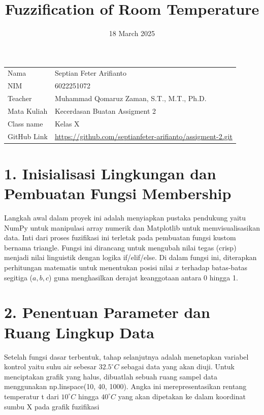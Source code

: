 \documentclass{article}
\title{Fuzzification of Room Temperature 
}
\date{18 March 2025}
\begin{document}
\maketitle


\noindent\begin{tabular}{l @{ : } l}
        Nama                &  Septian Feter Arifianto \\  
        NIM                 &  6022251072 \\  
        Teacher             &  Muhammad Qomaruz Zaman, S.T., M.T., Ph.D.\\
        Mata Kuliah         &  Kecerdasan Buatan Assigment 2 \\
\vspace{0,2cm}
        Class name          &  Kelas X\\
        GitHub Link & \url{https://github.com/septianfeter-arifianto/assigment-2.git}\\
\end{tabular}
\vspace{1cm}

\section*{1. Inisialisasi Lingkungan dan Pembuatan Fungsi Membership}
Langkah awal dalam proyek ini adalah menyiapkan pustaka pendukung yaitu NumPy untuk manipulasi array numerik dan Matplotlib untuk memvisualisasikan data. Inti dari proses fuzifikasi ini terletak pada pembuatan fungsi kustom bernama triangle. Fungsi ini dirancang untuk mengubah nilai tegas (crisp) menjadi nilai linguistik dengan logika if/elif/else. Di dalam fungsi ini, diterapkan perhitungan matematis untuk menentukan posisi nilai $x$ terhadap batas-batas segitiga ($a, b, c$) guna menghasilkan derajat keanggotaan antara 0 hingga 1.

\section*{2. Penentuan Parameter dan Ruang Lingkup Data}
Setelah fungsi dasar terbentuk, tahap selanjutnya adalah menetapkan variabel kontrol yaitu suhu air sebesar $32.5^\circ C$ sebagai data yang akan diuji. Untuk menciptakan grafik yang halus, dibuatlah sebuah ruang sampel data menggunakan np.linspace(10, 40, 1000). Angka ini merepresentasikan rentang temperatur t dari $10^\circ C$ hingga $40^\circ C$ yang akan dipetakan ke dalam koordinat sumbu X pada grafik fuzifikasi
\end{document}
